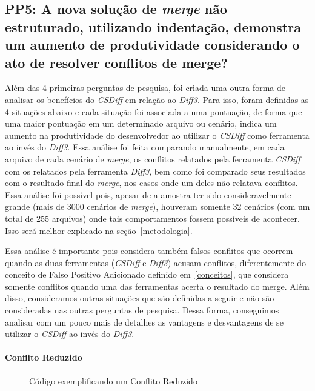 \subsection{PP5: A nova solução de \emph{merge} não estruturado, utilizando
	indentação, demonstra um aumento de produtividade considerando o ato de
	resolver conflitos de merge?}\label{concept_PP5}

Além das 4 primeiras perguntas de pesquisa, foi criada uma outra forma de
analisar os benefícios do \emph{CSDiff} em relação ao \emph{Diff3}. Para isso,
foram definidas as 4 situações abaixo e cada situação foi associada a uma
pontuação, de forma que uma maior pontuação em um determinado arquivo ou
cenário, indica um aumento na produtividade do desenvolvedor ao utilizar o
\emph{CSDiff} como ferramenta ao invés do \emph{Diff3}. Essa análise foi feita
comparando manualmente, em cada arquivo de cada cenário de \emph{merge}, os
conflitos relatados pela ferramenta \emph{CSDiff} com os relatados pela
ferramenta \emph{Diff3}, bem como foi comparado seus resultados com o resultado
final do \emph{merge}, nos casos onde um deles não relatava conflitos. Essa
análise foi possível pois, apesar de a amostra ter sido consideravelmente
grande (mais de 3000 cenários de \emph{merge}), houveram somente 32 cenários
(com um total de 255 arquivos) onde tais comportamentos fossem possíveis de
acontecer. Isso será melhor explicado na seção~\ref{metodologia}.

Essa análise é importante pois considera também falsos conflitos que ocorrem
quando as duas ferramentas (\emph{CSDiff} e \emph{Diff3}) acusam conflitos,
diferentemente do conceito de Falso Positivo Adicionado definido
em~\ref{conceitos}, que considera somente conflitos quando uma das ferramentas
acerta o resultado do merge. Além disso, consideramos outras situações que são
definidas a seguir e não são consideradas nas outras perguntas de pesquisa.
Dessa forma, conseguimos analisar com um pouco mais de detalhes as vantagens e
desvantagens de se utilizar o \emph{CSDiff} ao invés do \emph{Diff3}.

\paragraph{Conflito Reduzido}
\begin{figure}[ht]
	\begin{center}
		
		\caption{Código exemplificando um Conflito Reduzido}\label{conflito_reduzido}
	\end{center}
\end{figure}

